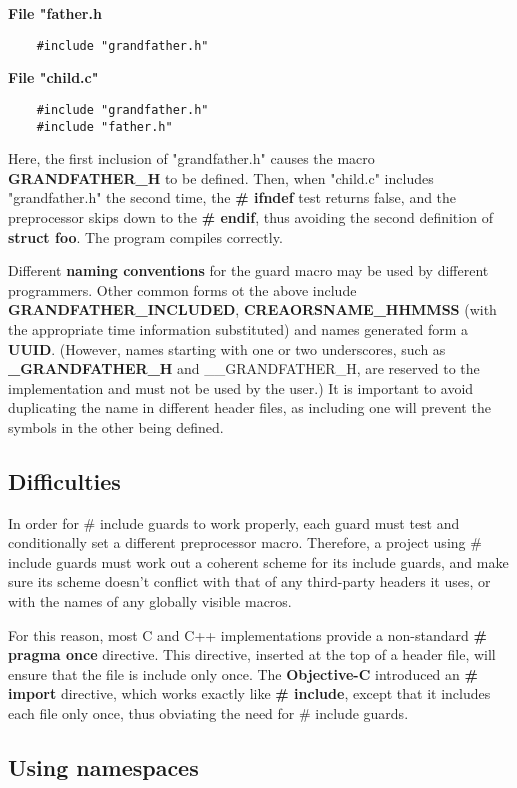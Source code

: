 	\textbf{File "father.h}
	\begin{verbatim}
	#include "grandfather.h"
	\end{verbatim}
	
	\textbf{File "child.c"}
	\begin{verbatim}
	#include "grandfather.h"
	#include "father.h"
	\end{verbatim}	
	
	Here, the first inclusion of "grandfather.h" causes the macro \textbf{GRANDFATHER\_H} to be defined. Then, when "child.c" includes "grandfather.h" the second time, the \textbf{\# ifndef} test returns false, and the preprocessor skips down to the \textbf{\# endif}, thus avoiding the second definition of \textbf{struct foo}. The program compiles correctly.
	
	Different \textbf{naming conventions} for the guard macro may be used by different programmers. Other common forms ot the above include \textbf{GRANDFATHER\_INCLUDED}, \textbf{CREAORSNAME\_HHMMSS} (with the appropriate time information substituted) and names generated form a \textbf{UUID}. (However, names starting with one or two underscores, such as \textbf{\_GRANDFATHER\_H} and \_\_GRANDFATHER\_H, are reserved to the implementation and must not be used by the user.) It is important to avoid duplicating the name in different header files, as including one will prevent the symbols in the other being defined.
	
	\subsection{Difficulties}
	In order for \# include guards to work properly, each guard must test and conditionally set a different preprocessor macro. Therefore, a project using \# include guards must work out a coherent scheme for its include guards, and make sure its scheme doesn't conflict with that of any third-party headers it uses, or with the names of any globally visible macros.
	
	For this reason, most C and C++ implementations provide a non-standard \textbf{\# pragma once} directive. This directive, inserted at the top of a header file, will ensure that the file is include only once. The \textbf{Objective-C} introduced an \textbf{\# import} directive, which works exactly like \textbf{\# include}, except that it includes each file only once, thus obviating the need for \# include guards.
	
	\subsection{Using namespaces}
